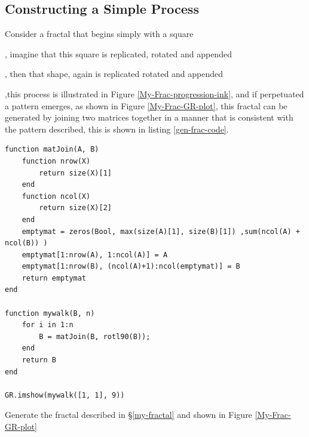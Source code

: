 \documentclass[a4paper,11pt,twoside]{article}
\begin{document}
\subsection{Constructing a Simple Process}
\label{sec:org05e6bd1}
Consider a fractal that begins simply with a square
  ,
imagine that this square is replicated, rotated and appended
, then that shape, again is replicated rotated and appended
,this    process is illustrated in Figure \ref{My-Frac-progression-ink}, and if perpetuated a pattern emerges, as shown in Figure \ref{My-Frac-GR-plot}, this fractal can be generated by joining two matrices together in a manner that is consistent with the pattern described, this is shown in listing \ref{gen-frac-code}.

\begin{listing}[htbp]
\begin{verbatim}
function matJoin(A, B)
    function nrow(X)
        return size(X)[1]
    end
    function ncol(X)
        return size(X)[2]
    end
    emptymat = zeros(Bool, max(size(A)[1], size(B)[1]) ,sum(ncol(A) + ncol(B)) )
    emptymat[1:nrow(A), 1:ncol(A)] = A
    emptymat[1:nrow(B), (ncol(A)+1):ncol(emptymat)] = B
    return emptymat
end

function mywalk(B, n)
    for i in 1:n
        B = matJoin(B, rotl90(B));
    end
    return B
end

GR.imshow(mywalk([1, 1], 9))
\end{verbatim}
\caption{\label{gen-frac-code}Generate the fractal described in \S \ref{my-fractal} and shown in Figure \ref{My-Frac-GR-plot}}
\end{listing}
\end{document}
